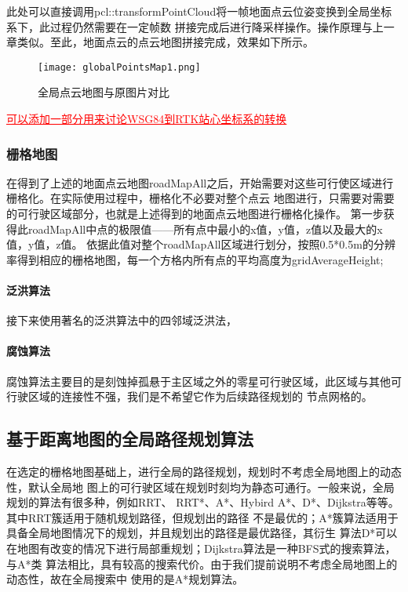 此处可以直接调用pcl::transformPointCloud将一帧地面点云位姿变换到全局坐标系下，此过程仍然需要在一定帧数
拼接完成后进行降采样操作。操作原理与上一章类似。至此，地面点云的点云地图拼接完成，效果如下所示。
\begin{figure}[ht]
    \centering
    \texttt{[image: globalPointsMap1.png]}
    \caption{全局点云地图与原图片对比}
\end{figure}

\textcolor{red}{\underline{可以添加一部分用来讨论WSG84到RTK站心坐标系的转换}}

\subsubsection{栅格地图}
在得到了上述的地面点云地图roadMapAll之后，开始需要对这些可行使区域进行栅格化。在实际使用过程中，栅格化不必要对整个点云
地图进行，只需要对需要的可行驶区域部分，也就是上述得到的地面点云地图进行栅格化操作。
第一步获得此roadMapAll中点的极限值——所有点中最小的x值，y值，z值以及最大的x值，y值，z值。
依据此值对整个roadMapAll区域进行划分，按照0.5*0.5m的分辨率得到相应的栅格地图，每一个方格内所有点的平均高度为gridAverageHeight;


\paragraph{泛洪算法}
接下来使用著名的泛洪算法中的四邻域泛洪法，

\paragraph{腐蚀算法}
腐蚀算法主要目的是刻蚀掉孤悬于主区域之外的零星可行驶区域，此区域与其他可行驶区域的连接性不强，我们是不希望它作为后续路径规划的
节点网格的。





\subsection{基于距离地图的全局路径规划算法}
在选定的栅格地图基础上，进行全局的路径规划，规划时不考虑全局地图上的动态性，默认全局地
图上的可行驶区域在规划时刻均为静态可通行。一般来说，全局规划的算法有很多种，例如RRT、
RRT*、A*、Hybird A*、D*、Dijkstra等等。其中RRT簇适用于随机规划路径，但规划出的路径
不是最优的；A*簇算法适用于具备全局地图情况下的规划，并且规划出的路径是最优路径，其衍生
算法D*可以在地图有改变的情况下进行局部重规划；Dijkstra算法是一种BFS式的搜索算法，与A*类
算法相比，具有较高的搜索代价。由于我们提前说明不考虑全局地图上的动态性，故在全局搜索中
使用的是A*规划算法。

